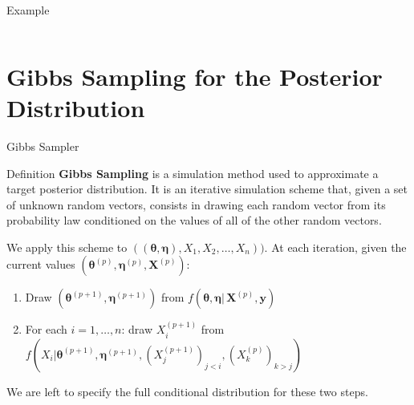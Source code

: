 \documentclass[aspectratio=169,xcolor=dvipsnames]{beamer}
\newcommand{\vecy}{\textbf{y}}
\newcommand{\matx}{\textbf{X}}
\newcommand{\veceta}{\boldsymbol{\eta}}
\newcommand{\vectheta}{\boldsymbol{\theta}}
\begin{document}
\begin{frame}{Example}
\begin{columns}
\begin{column}{.5\textwidth}
\begin{center}
 
    \end{center}
    
    
  
   
    \end{column}

    
\end{columns}
\end{frame}



\section{Gibbs Sampling for the Posterior Distribution}
\begin{frame}{Gibbs Sampler}
\begin{block}{Definition}
    \textbf{Gibbs Sampling} is a simulation method used to approximate a target posterior distribution. It is an iterative simulation scheme that, given a set of unknown random vectors, consists in drawing each random vector from its probability law conditioned on the values of all of the other random vectors.
\end{block}
\pause
\vspace{10pt}
We apply this scheme to $((\vectheta, \veceta), X_1, X_2, \dots, X_n)) $. \pause At each iteration, given the current values $(\vectheta^{(p)}, \veceta^{(p)}, \matx^{(p)})$:
\begin{enumerate}
    \item Draw $(\vectheta^{(p+1)}, \veceta^{(p+1)})$ from $f(\vectheta, \veceta | \, \matx^{(p)}, \vecy) $ \pause
    \item For each $i=1, \dots, n$: draw $X^{(p+1)}_i$ from $f(X_i| \vectheta^{(p+1)}, \veceta^{(p+1)}, (X_j^{(p+1)})_{j<i}, (X_k^{(p)})_{k>j} )$
\end{enumerate}
\pause
We are left to specify the full conditional distribution for these two steps.
\end{frame}
\end{document}
